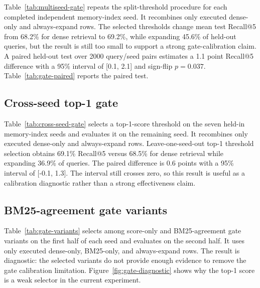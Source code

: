 \documentclass[10pt,twocolumn]{article}
\begin{document}
Table~\ref{tab:multiseed-gate} repeats the split-threshold procedure for each completed
independent memory-index seed. It recombines only executed dense-only and
always-expand rows. The selected thresholds change mean test Recall@5 from 68.2\% for dense retrieval to 69.2\%, while expanding 45.6\% of held-out queries, but the result is still too
small to support a strong gate-calibration claim. A paired held-out test over 2000 query/seed pairs estimates a 1.1 point Recall@5 difference with a 95\% interval of [0.1, 2.1] and sign-flip $p=0.037$.
Table~\ref{tab:gate-paired} reports the paired test.

\begin{table}[!tbp]
\caption{Paired uncertainty for held-out gate validation.}
\label{tab:gate-paired}
\centering
\scriptsize

\end{table}

\subsection{Cross-seed top-1 gate}
\begin{table}[!tbp]
\caption{Leave-one-seed-out top-1 gate validation.}
\label{tab:cross-seed-gate}
\centering
\scriptsize

\end{table}

Table~\ref{tab:cross-seed-gate} selects a top-1-score threshold on the seven
held-in memory-index seeds and evaluates it on the remaining seed. It recombines only executed
dense-only and always-expand rows. Leave-one-seed-out top-1 threshold selection obtains 69.1\% Recall@5 versus 68.5\% for dense retrieval while expanding 36.9\% of queries. The paired difference is 0.6 points with a 95\% interval of [-0.1, 1.3]. The interval
still crosses zero, so this result is useful as a calibration diagnostic rather
than a strong effectiveness claim.

\subsection{BM25-agreement gate variants}
\begin{table}[!tbp]
\caption{Held-out BM25-agreement gate variants.}
\label{tab:gate-variants}
\centering
\scriptsize

\end{table}

Table~\ref{tab:gate-variants} selects among score-only and BM25-agreement gate variants on
the first half of each seed and evaluates on the second half. It uses only
executed dense-only, BM25-only, and always-expand rows. The result is diagnostic:
the selected variants do not provide enough evidence to remove the gate
calibration limitation. Figure~\ref{fig:gate-diagnostic} shows why the
top-1 score is a weak selector in the current experiment.
\end{document}

